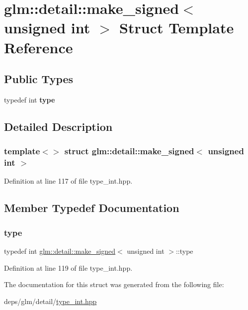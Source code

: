 \hypertarget{structglm_1_1detail_1_1make__signed_3_01unsigned_01int_01_4}{}\section{glm\+:\+:detail\+:\+:make\+\_\+signed$<$ unsigned int $>$ Struct Template Reference}
\label{structglm_1_1detail_1_1make__signed_3_01unsigned_01int_01_4}
\subsection*{Public Types}
\begin{DoxyCompactItemize}
\item 
\mbox{\label{structglm_1_1detail_1_1make__signed_3_01unsigned_01int_01_4_a78b4ada342bba40027f755d20eae141a}} 
typedef int {\bfseries type}
\end{DoxyCompactItemize}


\subsection{Detailed Description}
\subsubsection*{template$<$$>$\newline
struct glm\+::detail\+::make\+\_\+signed$<$ unsigned int $>$}



Definition at line 117 of file type\+\_\+int.\+hpp.



\subsection{Member Typedef Documentation}
\mbox{\label{structglm_1_1detail_1_1make__signed_3_01unsigned_01int_01_4_a78b4ada342bba40027f755d20eae141a}} 
\subsubsection{\texorpdfstring{type}{type}}
{\footnotesize\ttfamily typedef int \hyperlink{structglm_1_1detail_1_1make__signed}{glm\+::detail\+::make\+\_\+signed}$<$ unsigned int $>$\+::type}



Definition at line 119 of file type\+\_\+int.\+hpp.



The documentation for this struct was generated from the following file\+:\begin{DoxyCompactItemize}
\item 
deps/glm/detail/\hyperlink{type__int_8hpp}{type\+\_\+int.\+hpp}\end{DoxyCompactItemize}
